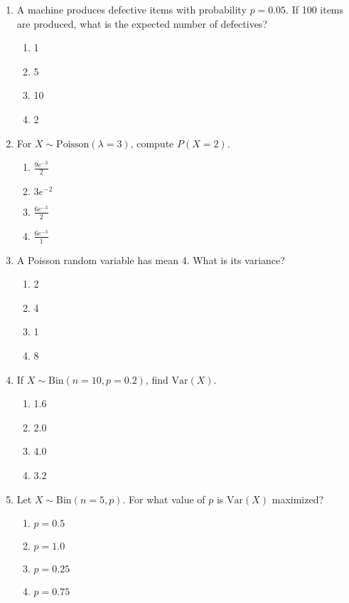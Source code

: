 \begin{enumerate}
\item A machine produces defective items with probability \(p=0.05\). If 100 items are produced, what is the expected number of defectives?

\begin{enumerate}[label=(\alph*)]
\item 1 \quad \item 5 \quad \item 10 \quad \item 2
\end{enumerate}

\item For \(X \sim \text{Poisson}(\lambda = 3)\), compute \(P(X = 2)\).

\begin{enumerate}[label=(\alph*)]
\item \(\frac{9e^{-3}}{2}\) \quad \item \(3e^{-2}\) \quad \item \(\frac{6e^{-3}}{2}\) \quad \item \(\frac{6e^{-3}}{1}\)
\end{enumerate}

\newpage
\item A Poisson random variable has mean 4. What is its variance?

\begin{enumerate}[label=(\alph*)]
\item 2 \quad \item 4 \quad \item 1 \quad \item 8
\end{enumerate}

\item If \(X \sim \text{Bin}(n=10, p=0.2)\), find \(\text{Var}(X)\).

\begin{enumerate}[label=(\alph*)]
\item 1.6 \quad \item 2.0 \quad \item 4.0 \quad \item 3.2
\end{enumerate}

\item Let \(X \sim \text{Bin}(n=5, p)\). For what value of \(p\) is \(\text{Var}(X)\) maximized?

\begin{enumerate}[label=(\alph*)]
\item \(p = 0.5\) \quad \item \(p = 1.0\) \quad \item \(p = 0.25\) \quad \item \(p = 0.75\)
\end{enumerate}


\end{enumerate}
